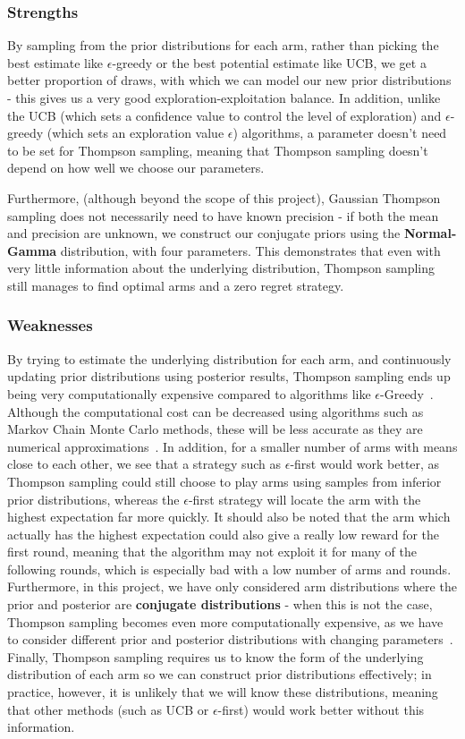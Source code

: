 \subsubsection{Strengths}
By sampling from the prior distributions for each arm, rather than picking the best estimate like $\epsilon$-greedy or the best potential estimate like UCB, we get a better proportion of draws, with which we can model our new prior distributions - this gives us a very good exploration-exploitation balance.
In addition, unlike the UCB (which sets a confidence value to control the level of exploration) and $\epsilon$-greedy (which sets an exploration value $\epsilon$) algorithms, a parameter doesn't need to be set for Thompson sampling, meaning that Thompson sampling doesn't depend on how well we choose our parameters.

Furthermore, (although beyond the scope of this project), Gaussian Thompson sampling does not necessarily need to have known precision - if both the mean and precision are unknown, we construct our conjugate priors using the \textbf{Normal-Gamma} distribution, with four parameters.
This demonstrates that even with very little information about the underlying distribution, Thompson sampling still manages to find optimal arms and a zero regret strategy.

\subsubsection{Weaknesses}
By trying to estimate the underlying distribution for each arm, and continuously updating prior distributions using posterior results, Thompson sampling ends up being very computationally expensive compared to algorithms like $\epsilon$-Greedy~\citep{mazumdar2020thompson}.
Although the computational cost can be decreased using algorithms such as Markov Chain Monte Carlo methods, these will be less accurate as they are numerical approximations~\citep{mazumdar2020thompson}.
In addition, for a smaller number of arms with means close to each other, we see that a strategy such as $\epsilon$-first would work better, as Thompson sampling could still choose to play arms using samples from inferior prior distributions, whereas the $\epsilon$-first strategy will locate the arm with the highest expectation far more quickly.
It should also be noted that the arm which actually has the highest expectation could also give a really low reward for the first round, meaning that the algorithm may not exploit it for many of the following rounds, which is especially bad with a low number of arms and rounds.
Furthermore, in this project, we have only considered arm distributions where the prior and posterior are \textbf{conjugate distributions} - when this is not the case, Thompson sampling becomes even more computationally expensive, as we have to consider different prior and posterior distributions with changing parameters~\citep{zhou2018racing}.
Finally, Thompson sampling requires us to know the form of the underlying distribution of each arm so we can construct prior distributions effectively; 
in practice, however, it is unlikely that we will know these distributions, meaning that other methods (such as UCB or $\epsilon$-first) would work better without this information.

